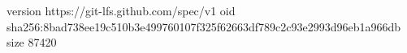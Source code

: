 version https://git-lfs.github.com/spec/v1
oid sha256:8bad738ee19c510b3e499760107f325f62663df789c2c93e2993d96eb1a966db
size 87420
